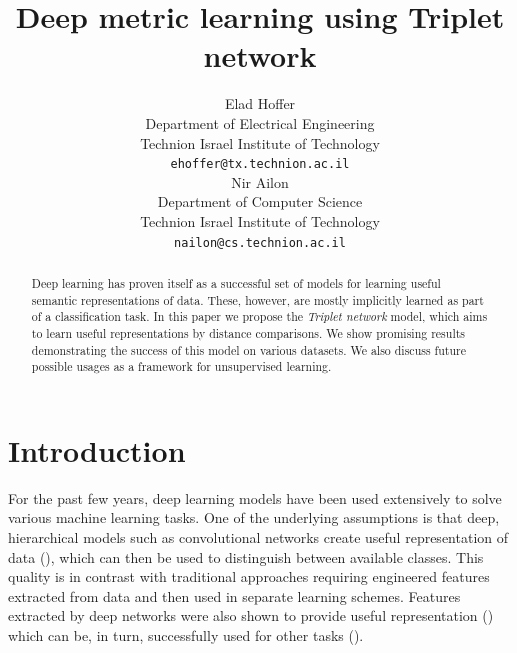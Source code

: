 \documentclass{article} %
\title{Deep metric learning using Triplet network}
\author{
Elad Hoffer \\
Department of Electrical Engineering\\
Technion Israel Institute of Technology\\
\texttt{ehoffer@tx.technion.ac.il} \\
\And
Nir Ailon \\
Department of Computer Science\\
Technion Israel Institute of Technology\\
\texttt{nailon@cs.technion.ac.il}
}
\begin{document}
\maketitle

\begin{abstract}
Deep learning has proven itself as a successful set of models for learning useful semantic representations of data. These, however, are mostly implicitly learned as part of a classification task.
In this paper we propose the \emph{Triplet network} model, which aims to learn useful representations by distance comparisons. We show promising results demonstrating the
success of this model on various datasets. We also discuss future possible usages as a framework for unsupervised learning.
\end{abstract}


\section{Introduction}
For the past few years, deep learning models have been used extensively to solve various machine learning tasks. One of the underlying assumptions is that deep, hierarchical models such as convolutional networks
create useful representation of data (\citet{Bengio2009,Hinton2007}), which can then be used to distinguish between available classes.
This quality is in contrast with traditional approaches  requiring engineered features extracted from data and then used in separate learning schemes.
Features extracted by deep networks were also shown to provide useful representation (\citet{Zeiler2013,Sermanet}) which can be, in turn, successfully used for other tasks (\citet{Razavian2014}).  %
\end{document}
